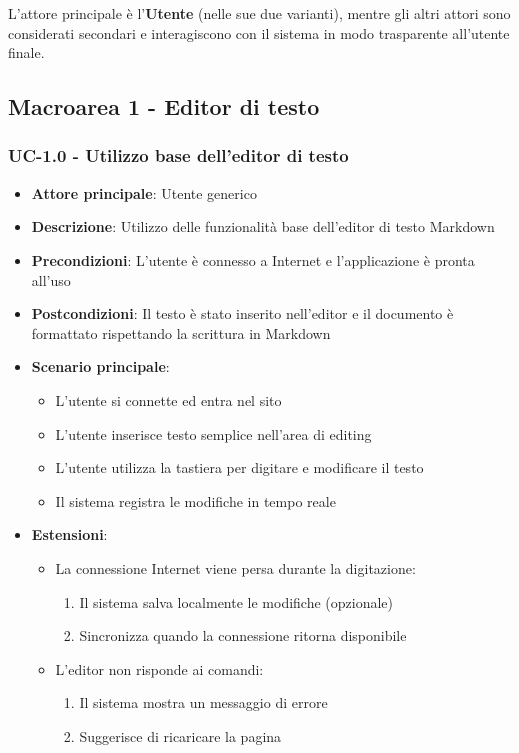 \documentclass[11pt,a4paper]{article}
\begin{document}
L'attore principale è l'\textbf{Utente} (nelle sue due varianti), mentre gli altri attori sono considerati secondari e interagiscono con il sistema in modo trasparente all'utente finale.

\newpage

\subsection{Macroarea 1 - Editor di testo}
\subsubsection{UC-1.0 - Utilizzo base dell'editor di testo}
\begin{itemize}
    \item \textbf{Attore principale}: Utente generico
    \item \textbf{Descrizione}: Utilizzo delle funzionalità base dell'editor di testo Markdown
    \item \textbf{Precondizioni}: L'utente è connesso a Internet e l'applicazione è pronta all'uso
    \item \textbf{Postcondizioni}: Il testo è stato inserito nell'editor e il documento è formattato rispettando la scrittura in Markdown
    \item \textbf{Scenario principale}:
        \begin{itemize}
            \item L'utente si connette ed entra nel sito
            \item L'utente inserisce testo semplice nell'area di editing
            \item L'utente utilizza la tastiera per digitare e modificare il testo
            \item Il sistema registra le modifiche in tempo reale
        \end{itemize}
    \item \textbf{Estensioni}:
        \begin{itemize}
            \item La connessione Internet viene persa durante la digitazione:
                \begin{enumerate}
                    \item Il sistema salva localmente le modifiche (opzionale)
                    \item Sincronizza quando la connessione ritorna disponibile
                \end{enumerate}
            \item L'editor non risponde ai comandi:
                \begin{enumerate}
                    \item Il sistema mostra un messaggio di errore
                    \item Suggerisce di ricaricare la pagina
                \end{enumerate}
        \end{itemize}
\end{itemize}
\end{document}
